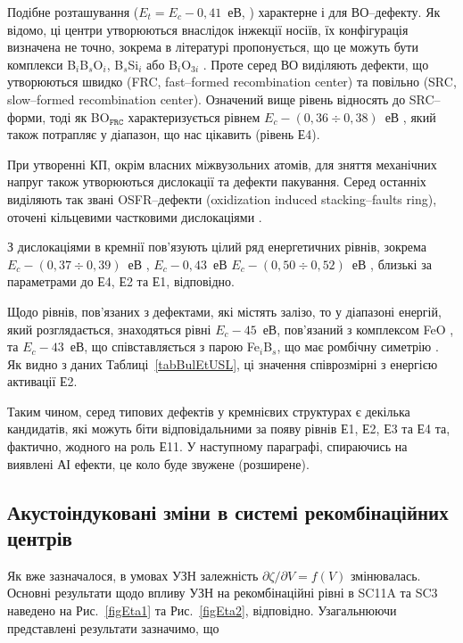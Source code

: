 Подібне розташування ($E_t=E_c-0,41$~еВ, \cite{LIDRev,LIDRev2,BO3i,Rein,LID:SchmidtJMR}) характерне і для ВО--дефекту.
Як відомо, ці центри утворюються внаслідок інжекції носіїв,
їх конфігурація визначена не точно, зокрема в літературі пропонується,
що це можуть бути комплекси B$_i$B$_s$O$_i$, B$_s$Si$_i$\cite{LIDRev} або
B$_i$O$_{3i}$ \cite{BO3i}.
Проте серед ВО виділяють дефекти,
що утворюються швидко (FRC, fast--formed recombination center)
та повільно (SRC, slow--formed recombination center).
Означений вище рівень відносять до SRC--форми,
тоді як  BO$_\mathtt{FRC}$ характеризується рівнем $E_c-(0,36\div0,38)$~еВ \cite{LIDRev2,BOSingle:SEMSS2017}, який
також потрапляє у діапазон, що нас цікавить (рівень Е4).

При утворенні КП, окрім власних міжвузольних атомів, для зняття механічних напруг також утворюються дислокації та дефекти пакування.
Серед останніх виділяють так звані OSFR--дефекти (oxidization induced stacking--faults ring), оточені кільцевими частковими дислокаціями \cite{MSER74,MSER28}.

З дислокаціями в кремнії пов'язують цілий ряд енергетичних рівнів, зокрема
$E_c-(0,37\div0,39)$~еВ \cite{PhysRevB56:10208,kveder2008,SiO:Hwang,disl10:Isakova,Kittler2003},
$E_c-0,43$~еВ \cite{PhysRevB56:10208,SiO:Vanhell}
$E_c-(0,50\div0,52)$~еВ \cite{Edis:Ogawa,Edis:Omling,Kittler2003},
близькі за параметрами до Е4, Е2 та Е1, відповідно.

Щодо рівнів, пов'язаних з дефектами, які містять залізо, то у діапазоні енергій, який розглядається,
знаходяться рівні $E_c-45$~еВ, пов'язаний з комплексом FeO \cite{FeO},
та $E_c-43$~еВ, що співставляється з парою Fe$_i$B$_s$, що має ромбічну симетрію \cite{FeB:PhysRevB49,Istratov1999}.
Як видно з даних Таблиці~\ref{tabBulEtUSL}, ці значення співрозмірні з енергією активації Е2.

Таким чином, серед типових дефектів у кремнієвих структурах є декілька кандидатів,
які можуть біти відповідальними за появу рівнів Е1, Е2, Е3 та Е4 та, фактично, жодного на роль Е11.
У наступному параграфі, спираючись на виявлені АІ ефекти, це коло буде звужене (розширене).

\subsection{Акустоіндуковані зміни в системі рекомбінаційних центрів\label{sbBul3}}

Як вже зазначалося, в умовах УЗН залежність $\partial \zeta/ \partial V = f (V)$ змінювалась.
Основні результати щодо впливу УЗН на рекомбінаційні рівні в SC11A та SC3 наведено
на Рис.~\ref{figEta1} та Рис.~\ref{figEta2}, відповідно.
Узагальнюючи представлені результати зазначимо, що


